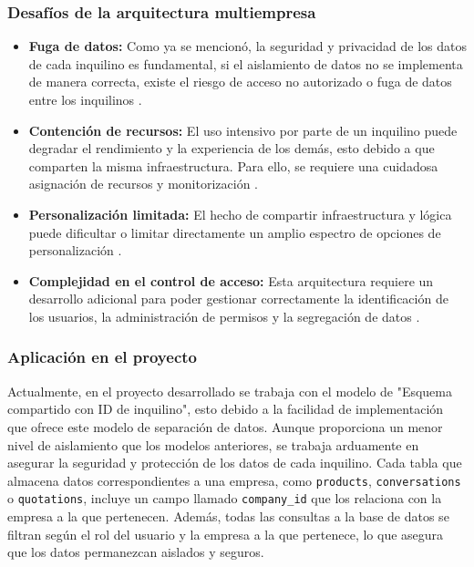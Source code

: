 \subsubsection{Desafíos de la arquitectura multiempresa}
\label{subsec:desafios_multitenant}

\begin{itemize}
    \item \textbf{Fuga de datos:} Como ya se mencionó, la seguridad y privacidad de los datos de cada inquilino es fundamental, si el aislamiento de datos no se implementa de manera correcta, existe el riesgo de acceso no autorizado o fuga de datos entre los inquilinos \cite{futureprocessing2025multitenant}.
    \item \textbf{Contención de recursos:} El uso intensivo por parte de un inquilino puede degradar el rendimiento y la experiencia de los demás, esto debido a que comparten la misma infraestructura. Para ello, se requiere una cuidadosa asignación de recursos y monitorización \cite{futureprocessing2025multitenant}.
    \item \textbf{Personalización limitada:} El hecho de compartir infraestructura y lógica puede dificultar o limitar directamente un amplio espectro de opciones de personalización \cite{futureprocessing2025multitenant}.
    \item \textbf{Complejidad en el control de acceso:} Esta arquitectura requiere un desarrollo adicional para poder gestionar correctamente la identificación de los usuarios, la administración de permisos y la segregación de datos \cite{futureprocessing2025multitenant}.
\end{itemize}

\subsubsection{Aplicación en el proyecto}
\label{subsec:multitenant_aplicacion}

Actualmente, en el proyecto desarrollado se trabaja con el modelo de "Esquema compartido con ID de inquilino", esto debido a la facilidad de implementación que ofrece este modelo de separación de datos. Aunque proporciona un menor nivel de aislamiento que los modelos anteriores, se trabaja arduamente en asegurar la seguridad y protección de los datos de cada inquilino. Cada tabla que almacena datos correspondientes a una empresa, como \texttt{products}, \texttt{conversations} o \texttt{quotations}, incluye un campo llamado \texttt{company\_id} que los relaciona con la empresa a la que pertenecen. Además, todas las consultas a la base de datos se filtran según el rol del usuario y la empresa a la que pertenece, lo que asegura que los datos permanezcan aislados y seguros.

